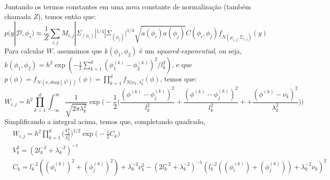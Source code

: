 \documentclass[12pt]{article}
\begin{document}
 Juntando os termos constantes em uma nova constante de normalização (também chamada $Z$), temos então que:
 \begin{equation}
  p(y | \mathcal{D},\phi_s) \approx \frac{1}{Z} \sum_{i,j}  M_{i,j} |\Sigma_{(\phi_i)}|^{1/4} |\Sigma_{(\phi_j)}|^{1/4} 
  \sqrt{a(\phi_i) a(\phi_j)} C(\phi_i,\phi_j) f_{N(\mu_{i,j}, \Sigma_{i,j})}(y)
 \end{equation}
 Para calcular $W$, assumimos que $k(\phi_1,\phi_2)$ é um \textit{squared-exponential}, ou seja, 
 $k(\phi_1,\phi_2) = h^2 \exp(-\frac{1}{2} \sum_{k=1}^d (\phi_1^{(k)} - \phi_2^{(k)})^2/l_k^2)$, 
 e que $p(\phi) = f_{\mathcal{N}(\nu,{diag}(\lambda^2))}(\phi) = 
 \prod_{k=1}^d f_{N(\nu_k,\lambda_k^2}(\phi)$, temos que:
 \begin{equation}
  W_{i,j} = h^2 \prod_{k=1}^{d} \int_{-\infty}^{\infty}
	  \frac{1}{\sqrt{2 \pi \lambda_k^2}}\exp \Big(-\frac{1}{2} \Big( 
		  \frac{(\phi^{(k)} - \phi_j^{(k)})^2}{l_k^2} + \frac{(\phi^{(k)} - \phi_j^{(k)})^2}{l_k^2} 
		    + + \frac{(\phi^{(k)} - \nu_k)^2}{\lambda_k^2} \Big) \Big)
 \end{equation}
 Simplificando a integral acima, temos que, completando quadrado,
 \begin{equation}
 \begin{split}
  & W_{i,j} = h^2 \prod_{k=1}^{d} \Big( \frac{V_k^2}{\lambda_k^2} \Big)^{1/2} \exp \Big(-\frac{1}{2} C_k \Big) \\
  & V_k^2 = (2 l_k^{-2} + \lambda_k^{-2})^{-1} \\
  & C_k = l_k^{-2} ((\phi_i^{(k)})^2 + (\phi_j^{(k)})^2) + \lambda_k^{-2}\nu_k^2 
    - (2 l_k^{-2} + \lambda_k^{-2})^{-1} (l_k^{-2} ((\phi_i^{(k)}) + (\phi_j^{(k)})) + \lambda_k^{-2}\nu_k)^2
 \end{split}
 \end{equation}
\end{document}
